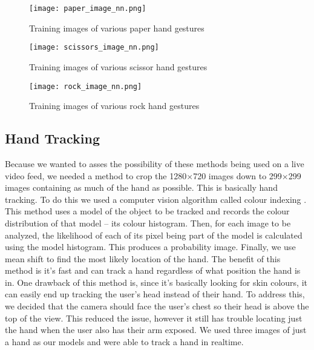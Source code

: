 \begin{figure}[h]
\texttt{[image: paper\_image\_nn.png]}
\centering
\caption{Training images of various paper hand gestures}
\end{figure}

\begin{figure}[h]
\texttt{[image: scissors\_image\_nn.png]}
\centering
\caption{Training images of various scissor hand gestures}
\end{figure}

\begin{figure}[h]
\texttt{[image: rock\_image\_nn.png]}
\centering
\caption{Training images of various rock hand gestures}
\end{figure}

\subsection{Hand Tracking}
Because we wanted to asses the possibility of these methods being used on a live video feed, we needed a method to crop the 1280$\times$720 images down to 299$\times$299 images containing as much of the hand as possible. This is basically hand tracking. To do this we used a computer vision algorithm called colour indexing \cite{swain}. This method uses a model of the object to be tracked and records the colour distribution of that model -- its colour histogram. Then, for each image to be analyzed, the likelihood of each of its pixel being part of the model is calculated using the model histogram. This produces a probability image. Finally, we use mean shift to find the most likely location of the hand. The benefit of this method is it's fast and can track a hand regardless of what position the hand is in. One drawback of this method is, since it's basically looking for skin colours, it can easily end up tracking the user's head instead of their hand. To address this, we decided that the camera should face the user's chest so their head is above the top of the view. This reduced the issue, however it still has trouble locating just the hand when the user also has their arm exposed. We used three images of just a hand as our models and were able to track a hand in realtime. 